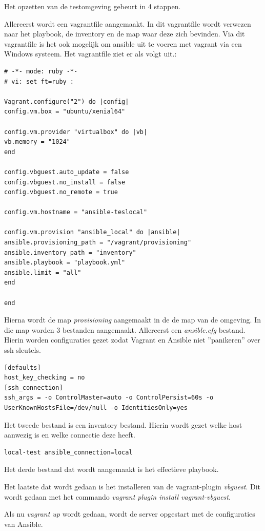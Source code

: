 Het opzetten van de testomgeving gebeurt in 4 stappen. 

Allereerst wordt een vagrantfile aangemaakt. In dit vagrantfile wordt verwezen naar het playbook, de inventory en de map waar deze zich bevinden. Via dit vagrantfile is het ook mogelijk om ansible uit te voeren met vagrant via een Windows systeem. Het vagrantfile ziet er als volgt uit.:
\begin{lstlisting}
# -*- mode: ruby -*-
# vi: set ft=ruby :

Vagrant.configure("2") do |config|
config.vm.box = "ubuntu/xenial64"

config.vm.provider "virtualbox" do |vb|
vb.memory = "1024"
end

config.vbguest.auto_update = false
config.vbguest.no_install = false
config.vbguest.no_remote = true

config.vm.hostname = "ansible-teslocal"

config.vm.provision "ansible_local" do |ansible|
ansible.provisioning_path = "/vagrant/provisioning"
ansible.inventory_path = "inventory"
ansible.playbook = "playbook.yml"
ansible.limit = "all"
end

end
\end{lstlisting}

Hierna wordt de map \textit{provisioning} aangemaakt in de de map van de omgeving. In die map worden 3 bestanden aangemaakt. Allereerst een \textit{ansible.cfg} bestand. Hierin worden configuraties gezet zodat Vagrant en Ansible niet ''panikeren'' over ssh sleutels.
\begin{lstlisting}
[defaults]
host_key_checking = no
[ssh_connection]
ssh_args = -o ControlMaster=auto -o ControlPersist=60s -o UserKnownHostsFile=/dev/null -o IdentitiesOnly=yes
\end{lstlisting}
Het tweede bestand is een inventory bestand. Hierin wordt gezet welke host aanwezig is en welke connectie deze heeft.
\begin{lstlisting}
local-test ansible_connection=local
\end{lstlisting}

Het derde bestand dat wordt aangemaakt is het effectieve playbook.

Het laatste dat wordt gedaan is het installeren van de vagrant-plugin \textit{vbguest}. Dit wordt gedaan met het commando \textit{vagrant plugin install vagrant-vbguest}.

Als nu \textit{vagrant up} wordt gedaan, wordt de server opgestart met de configuraties van Ansible.

